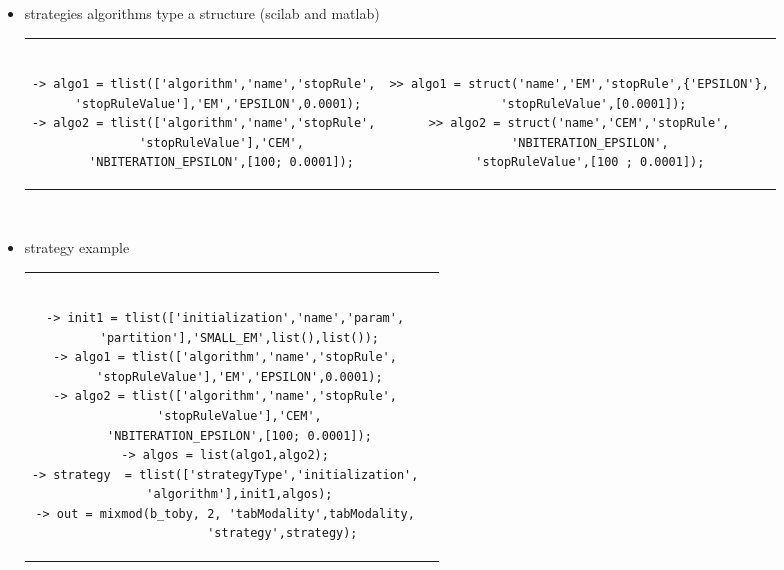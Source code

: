 \begin{itemize}
\begin{itemize}
\item strategies algorithms type a structure (scilab and matlab)



	\begin{tabular}{c|c}
	\begin{minipage}[c]{0.42\columnwidth}%
	{\scriptsize
	\begin{verbatim}

-> algo1 = tlist(['algorithm','name','stopRule',
    'stopRuleValue'],'EM','EPSILON',0.0001);
-> algo2 = tlist(['algorithm','name','stopRule',
     'stopRuleValue'],'CEM',
     'NBITERATION_EPSILON',[100; 0.0001]);

\end{verbatim}}
	\end{minipage}%
&
	\begin{minipage}[c]{0.58\columnwidth}%
	{\scriptsize
	\begin{verbatim}

>> algo1 = struct('name','EM','stopRule',{'EPSILON'},
    'stopRuleValue',[0.0001]);
>> algo2 = struct('name','CEM','stopRule',
   'NBITERATION_EPSILON',
   'stopRuleValue',[100 ; 0.0001]);

\end{verbatim}}
	\end{minipage}%
	\end{tabular}\\

	\item{strategy example }


\begin{tabular}{c|c}
\begin{minipage}[c]{0.46\columnwidth}%
{\scriptsize
\begin{verbatim}

-> init1 = tlist(['initialization','name','param',
    'partition'],'SMALL_EM',list(),list());
-> algo1 = tlist(['algorithm','name','stopRule',
    'stopRuleValue'],'EM','EPSILON',0.0001);
-> algo2 = tlist(['algorithm','name','stopRule',
    'stopRuleValue'],'CEM',
    'NBITERATION_EPSILON',[100; 0.0001]);
-> algos = list(algo1,algo2);
-> strategy  = tlist(['strategyType','initialization',
    'algorithm'],init1,algos);
-> out = mixmod(b_toby, 2, 'tabModality',tabModality,
                'strategy',strategy);

\end{verbatim}}
\end{minipage}%
&
\begin{minipage}[c]{0.54\columnwidth}%
{\scriptsize
\begin{verbatim}


\end{verbatim}}
\end{minipage}
\end{tabular}
\end{itemize}
\end{itemize}
